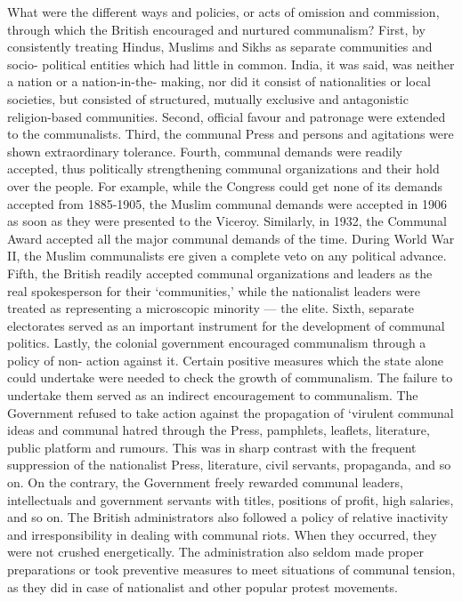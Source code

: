 What were the different ways and policies, or acts of omission and commission, through which the British encouraged and nurtured communalism? First, by consistently treating Hindus, Muslims and Sikhs as separate communities and socio- political entities which had little in common. India, it was said, was neither a nation or a nation-in-the- making, nor did it consist of nationalities or local societies, but consisted of structured, mutually exclusive and antagonistic religion-based communities. Second, official favour and patronage were extended to the communalists. Third, the communal Press and persons and agitations were shown extraordinary tolerance. Fourth, communal demands were readily accepted, thus politically strengthening communal organizations and their hold over the people. For example, while the Congress could get none of its demands accepted from 1885-1905, the Muslim communal demands were accepted in 1906 as soon as they were presented to the Viceroy. Similarly, in 1932, the Communal Award accepted all the major communal demands of the time. During World War II, the Muslim communalists ere given a complete veto on any political advance. Fifth, the British readily accepted communal organizations and leaders as the real spokesperson for their `communities,' while the nationalist leaders were treated as representing a microscopic minority — the elite. Sixth, separate electorates served as an important instrument for the development of communal politics. Lastly, the colonial government encouraged communalism through a policy of non- action against it. Certain positive measures which the state alone could undertake were needed to check the growth of communalism. The failure to undertake them served as an indirect encouragement to communalism. The Government refused to take action against the propagation of `virulent communal ideas and communal hatred through the Press, pamphlets, leaflets, literature, public platform and rumours. This was in sharp contrast with the frequent suppression of the nationalist Press, literature, civil servants, propaganda, and so on. On the contrary, the Government freely rewarded communal leaders, intellectuals and government servants with titles, positions of profit, high salaries, and so on. The British administrators also followed a policy of relative inactivity and irresponsibility in dealing with communal riots. When they occurred, they were not crushed energetically. The administration also seldom made proper preparations or took preventive measures to meet situations of communal tension, as they did in case of nationalist and other popular protest movements. 


